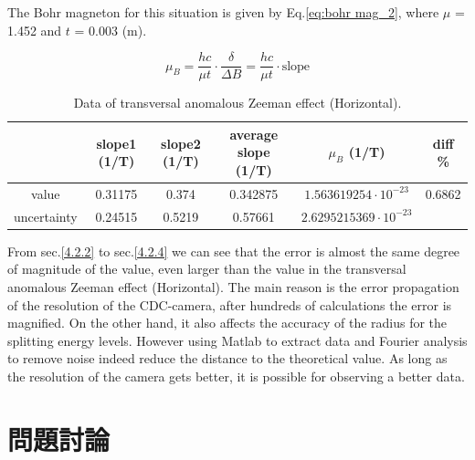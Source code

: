 \documentclass[a4paper,12pt]{article}
\begin{document}
    \par The Bohr magneton for this situation is given by Eq.\ref{eq:bohr mag_2}, where $\mu$ = 1.452 and $t$ = 0.003 (m).
    
    \begin{equation}
        \mu_B = \frac{hc}{\mu t} \cdot \frac{\delta}{\Delta B}=\frac{hc}{\mu t} \cdot \text{slope}
        \label{eq:bohr mag_2}  
    \end{equation}
    
    \begin{table}[H]
        \centering
        \caption{Data of transversal anomalous Zeeman effect (Horizontal).}
        \begin{tabular}{c|c|c|c|c|c}
             &slope1 (1/T)& slope2 (1/T)& average slope (1/T)& $\mu_B$ (1/T)& diff \% \\ \hline \hline
            value&0.31175&0.374&0.342875&$1.563619254\cdot 10^{-23}$&0.6862  \\ \hline
            uncertainty&0.24515&0.5219&0.57661&$2.6295215369\cdot 10^{-23}$& \\ \hline
            
        \end{tabular}
        \label{tab:tra_ano_ver_final_data}
    \end{table}
    
    \par From sec.\ref{4.2.2} to sec.\ref{4.2.4} we can see that the error is almost the same degree of magnitude of the value, even larger than the value in the transversal anomalous Zeeman effect (Horizontal). The main reason is the error propagation of the resolution of the CDC-camera, after hundreds of calculations the error is magnified. On the other hand, it also affects the accuracy of the radius for the splitting energy levels. However using Matlab to extract data and Fourier analysis to remove noise indeed reduce the distance to the theoretical value. As long as the resolution of the camera gets better, it is possible for 
     observing a better data.
    
    \section{問題討論}
\end{document}
